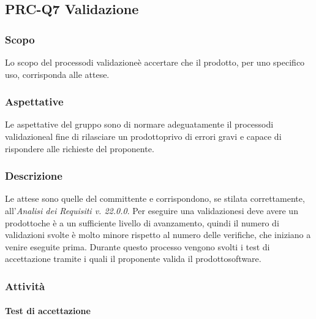 \subsection{PRC-Q7 Validazione}

\subsubsection{Scopo}
Lo scopo del processo\glosp di validazione\glosp è accertare che il prodotto\glo, per uno specifico uso, corrisponda alle attese.

\subsubsection{Aspettative}
Le aspettative del gruppo sono di normare adeguatamente il processo\glosp di validazione\glosp al fine di rilasciare un prodotto\glosp privo di errori gravi e capace di rispondere alle richieste del proponente.

\subsubsection{Descrizione}
Le attese sono quelle del committente e corrispondono, se stilata correttamente, all'\textit{Analisi dei Requisiti v. 22.0.0}. 
Per eseguire una validazione\glosp si deve avere un prodotto\glosp che è a un sufficiente livello di avanzamento, quindi il numero di validazioni svolte è molto minore rispetto al numero delle verifiche, che iniziano a venire eseguite prima.
Durante questo processo vengono svolti i test di accettazione tramite i quali il proponente valida il prodotto\glosp software.

\subsubsection{Attività}
	\paragraph{Test di accettazione}
